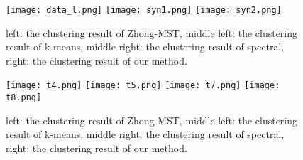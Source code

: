 	    \begin{figure}[htb]
	          \centering
	          \texttt{[image: data\_l.png]}
	          \texttt{[image: syn1.png]}
	          \texttt{[image: syn2.png]}
	          \caption{left: the clustering result of Zhong-MST, middle left: the clustering result of k-means, middle right: the clustering result of spectral, right: the clustering result of our method.}
	      \end{figure}
	    \begin{figure}[htb]
	          \centering
	          \texttt{[image: t4.png]}
	          \texttt{[image: t5.png]}
	          \texttt{[image: t7.png]}
	          \texttt{[image: t8.png]}
	          \caption{left: the clustering result of Zhong-MST, middle left: the clustering result of k-means, middle right: the clustering result of spectral, right: the clustering result of our method.}
	        \end{figure}

